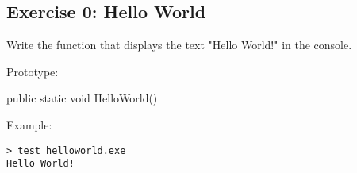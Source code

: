\subsection{Exercise 0: Hello World}

Write the  function that displays the text "Hello World!" in the console.

Prototype:
\begin{code}
public static void HelloWorld()
\end{code}

Example:
\begin{verbatim}
> test_helloworld.exe
Hello World!
\end{verbatim} 